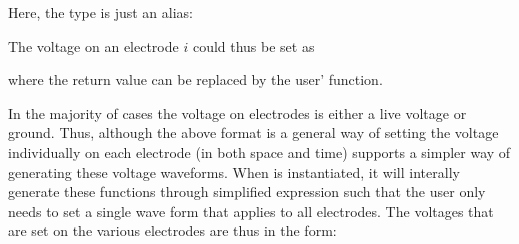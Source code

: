 \documentclass[letterpaper,10pt,english]{sphinxmanual}
\begin{document}
Here, the type  is just an alias:

\begin{sphinxVerbatim}[commandchars=\\\{\},formatcom=\scriptsize]
        
\end{sphinxVerbatim}

The voltage on an electrode \(i\) could thus be set as

\begin{sphinxVerbatim}[commandchars=\\\{\},formatcom=\scriptsize]
 

   \PYG{p}{[}\PYG{p}{]}       
     

 
\end{sphinxVerbatim}

where the return value can be replaced by the user’ function.

In the majority of cases the voltage on electrodes is either a live voltage or ground.
Thus, although the above format is a general way of setting the voltage individually on each electrode (in both space and time)  supports a simpler way of generating these voltage waveforms.
When  is instantiated, it will interally generate these functions through simplified expression such that the user only needs to set a single wave form that applies to all electrodes.
The voltages that are set on the various electrodes are thus in the form:
\end{document}
